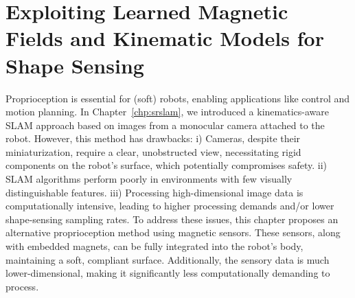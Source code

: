 \chapter{Exploiting Learned Magnetic Fields and Kinematic Models for Shape Sensing}
\label{chp:promasens}

\begin{foreword}
    Proprioception is essential for (soft) robots, enabling applications like control and motion planning. In Chapter~\ref{chp:srslam}, we introduced a kinematics-aware \gls{SLAM} approach based on images from a monocular camera attached to the robot. However, this method has drawbacks: i) Cameras, despite their miniaturization, require a clear, unobstructed view, necessitating rigid components on the robot’s surface, which potentially compromises safety. ii) \gls{SLAM} algorithms perform poorly in environments with few visually distinguishable features. iii) Processing high-dimensional image data is computationally intensive, leading to higher processing demands and/or lower shape-sensing sampling rates. To address these issues, this chapter proposes an alternative proprioception method using magnetic sensors. These sensors, along with embedded magnets, can be fully integrated into the robot’s body, maintaining a soft, compliant surface. Additionally, the sensory data is much lower-dimensional, making it significantly less computationally demanding to process.

\end{foreword}
